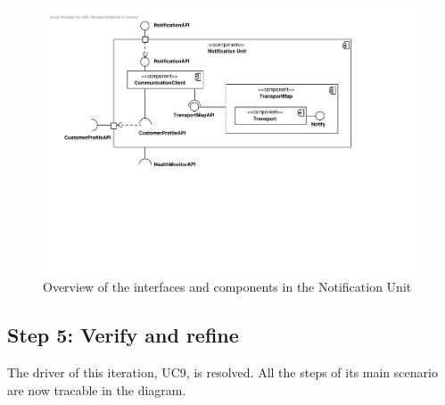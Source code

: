 \begin{figure}[H]
	\begin{centering}
		\includegraphics[width=\textwidth]{figs/add-it8-interfaces.pdf}
		\caption{Overview of the interfaces and components in the Notification Unit}
		\label{fig:it8/interfaces}
	\end{centering}
\end{figure}

\subsection{Step 5: Verify and refine}
\label{add:it8/verification}

\npar The driver of this iteration, UC9, is resolved. All the steps of its main
scenario are now tracable in the diagram.
